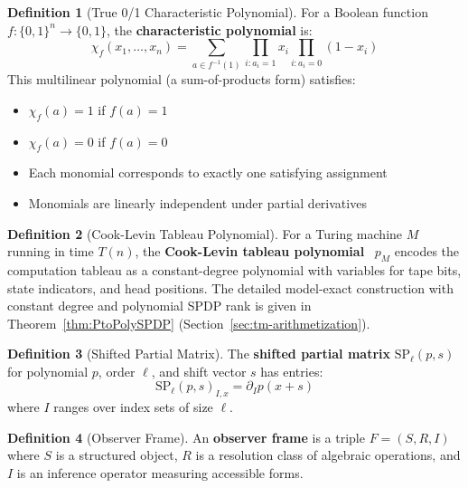 \documentclass[12pt]{article}
\theoremstyle{definition}
\newtheorem{definition}{Definition}
\theoremstyle{definition}
\theoremstyle{remark}
\theoremstyle{remark}
\begin{document}
\begin{definition}[True 0/1 Characteristic Polynomial]
For a Boolean function $f: \{0,1\}^n \to \{0,1\}$, the \textbf{characteristic polynomial} is:
\[
\chi_f(x_1, \ldots, x_n) = \sum_{a \in f^{-1}(1)} \prod_{i: a_i=1} x_i \prod_{i: a_i=0} (1-x_i)
\]
This multilinear polynomial (a sum-of-products form) satisfies:
\begin{itemize}
\item $\chi_f(a) = 1$ if $f(a) = 1$
\item $\chi_f(a) = 0$ if $f(a) = 0$
\item Each monomial corresponds to exactly one satisfying assignment
\item Monomials are linearly independent under partial derivatives
\end{itemize}
\end{definition}

\begin{definition}[Cook-Levin Tableau Polynomial]
For a Turing machine $M$ running in time $T(n)$, the \textbf{Cook-Levin tableau polynomial}~\cite{cook1971,levin1984} $p_M$ encodes the computation tableau as a constant-degree polynomial with variables for tape bits, state indicators, and head positions. The detailed model-exact construction with constant degree and polynomial SPDP rank is given in Theorem~\ref{thm:PtoPolySPDP} (Section~\ref{sec:tm-arithmetization}).
\end{definition}

\begin{definition}[Shifted Partial Matrix]
The \textbf{shifted partial matrix} $\mathrm{SP}_{\ell}(p, s)$ for polynomial $p$, order $\ell$, and shift vector $s$ has entries:
\[
\mathrm{SP}_{\ell}(p, s)_{I,x} = \partial_I p(x + s)
\]
where $I$ ranges over index sets of size $\ell$.
\end{definition}

\begin{definition}[Observer Frame]
An \textbf{observer frame} is a triple $F = (S, R, I)$ where $S$ is a structured object, $R$ is a resolution class of algebraic operations, and $I$ is an inference operator measuring accessible forms.
\end{definition}
\end{document}
